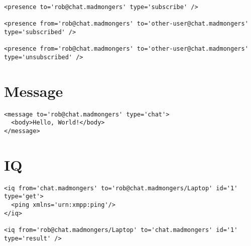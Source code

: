 \newpage
\begin{shaded}
\begin{verbatim}
<presence to='rob@chat.madmongers' type='subscribe' />

<presence from='rob@chat.madmongers' to='other-user@chat.madmongers' type='subscribed' />

<presence from='rob@chat.madmongers' to='other-user@chat.madmongers' type='unsubscribed' />
\end{verbatim}
\end{shaded}

\newpage
\section{Message}

\begin{shaded}
\begin{verbatim}
<message to='rob@chat.madmongers' type='chat'>
  <body>Hello, World!</body>
</message>
\end{verbatim}
\end{shaded}

\newpage
\section{IQ}

\begin{shaded}
\begin{verbatim}
<iq from='chat.madmongers' to='rob@chat.madmongers/Laptop' id='1' type='get'>
  <ping xmlns='urn:xmpp:ping'/>
</iq>

<iq from='rob@chat.madmongers/Laptop' to='chat.madmongers' id='1' type='result' />
\end{verbatim}
\end{shaded}
